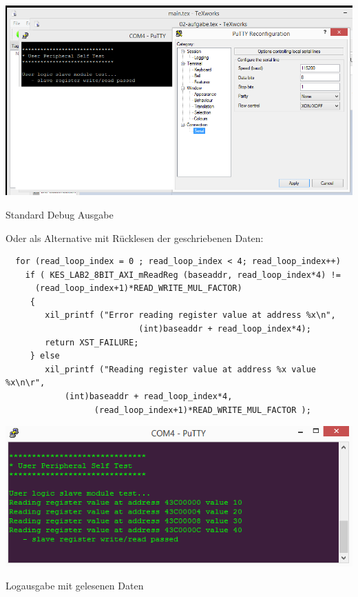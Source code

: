 \begin{minipage}{\textwidth}
    \begin{center}        
        \includegraphics[scale=0.5]{img/debugselftest.png} 
    \end{center}
\end{minipage}
\begin{center}
Standard Debug Ausgabe
\end{center}

Oder als Alternative mit Rücklesen der geschriebenen Daten:
\begin{verbatim}
  for (read_loop_index = 0 ; read_loop_index < 4; read_loop_index++)
    if ( KES_LAB2_8BIT_AXI_mReadReg (baseaddr, read_loop_index*4) !=
      (read_loop_index+1)*READ_WRITE_MUL_FACTOR)
     {
        xil_printf ("Error reading register value at address %x\n", 
                           (int)baseaddr + read_loop_index*4);
        return XST_FAILURE;
     } else
        xil_printf ("Reading register value at address %x value %x\n\r",
            (int)baseaddr + read_loop_index*4, 
                  (read_loop_index+1)*READ_WRITE_MUL_FACTOR );
\end{verbatim}

\begin{minipage}{\textwidth}
    \begin{center}        
        \includegraphics[scale=0.5]{img/debugselftest2.png} 
    \end{center}
\end{minipage}
\begin{center}
Logausgabe mit gelesenen Daten
\end{center}

